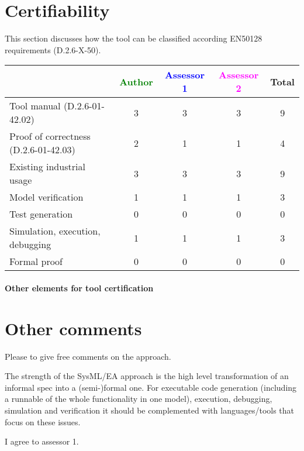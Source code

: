 \section{Certifiability}

This section discusses how the tool can be classified according EN50128 requirements (D.2.6-X-50).


\begin{tabular}{|l | c | c | c | c|}
\hline
& \textcolor{green}{Author} & \textcolor{blue}{Assessor 1} & \textcolor{magenta}{Assessor 2} & Total \\
\hline 
Tool manual (D.2.6-01-42.02) &3 & 3&3 & 9 \\
\hline
Proof of correctness (D.2.6-01-42.03)   &2 & 1& 1& 4 \\
\hline
Existing industrial  usage  &3 & 3&3 & 9 \\
\hline
Model verification &1 & 1& 1& 3  \\
\hline
Test generation &0 & 0& 0& 0 \\
\hline
Simulation, execution, debugging &1 & 1&1 & 3 \\
\hline
Formal proof &0 & 0& 0& 0 \\
\hline
\end{tabular}

\paragraph{Other elements for tool certification}

\section{Other comments}
Please to  give free comments on the approach.

\begin{assessor1}
The strength of the SysML/EA approach is the high level transformation of an informal spec into a (semi-)formal one. 
For executable code generation (including a runnable of the whole functionality in one model), execution, debugging, simulation and verification it should be complemented with languages/tools that focus on these issues.
\end{assessor1}

\begin{assessor2}
I agree to assessor 1.
\end{assessor2}


